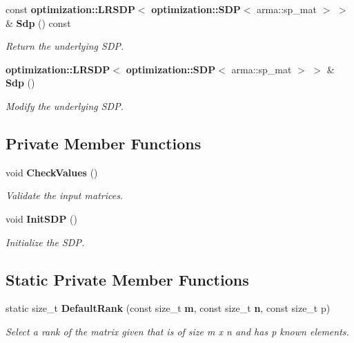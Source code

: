 \begin{DoxyCompactItemize}
const {\bf optimization\+::\+L\+R\+S\+DP}$<$ {\bf optimization\+::\+S\+DP}$<$ arma\+::sp\+\_\+mat $>$ $>$ \& {\bf Sdp} () const 
\begin{DoxyCompactList}\small\item\em Return the underlying S\+DP. \end{DoxyCompactList}\item 
{\bf optimization\+::\+L\+R\+S\+DP}$<$ {\bf optimization\+::\+S\+DP}$<$ arma\+::sp\+\_\+mat $>$ $>$ \& {\bf Sdp} ()
\begin{DoxyCompactList}\small\item\em Modify the underlying S\+DP. \end{DoxyCompactList}\end{DoxyCompactItemize}
\subsection*{Private Member Functions}
\begin{DoxyCompactItemize}
\item 
void {\bf Check\+Values} ()
\begin{DoxyCompactList}\small\item\em Validate the input matrices. \end{DoxyCompactList}\item 
void {\bf Init\+S\+DP} ()
\begin{DoxyCompactList}\small\item\em Initialize the S\+DP. \end{DoxyCompactList}\end{DoxyCompactItemize}
\subsection*{Static Private Member Functions}
\begin{DoxyCompactItemize}
\item 
static size\+\_\+t {\bf Default\+Rank} (const size\+\_\+t {\bf m}, const size\+\_\+t {\bf n}, const size\+\_\+t p)
\begin{DoxyCompactList}\small\item\em Select a rank of the matrix given that is of size m x n and has p known elements. \end{DoxyCompactList}\end{DoxyCompactItemize}
